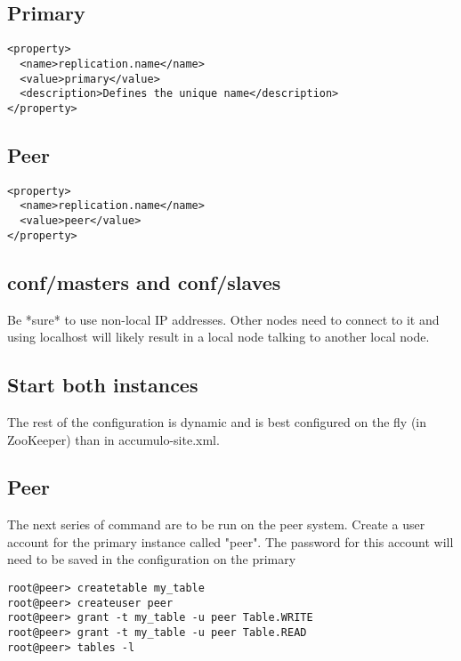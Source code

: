 \subsection{Primary}

\begingroup\fontsize{8pt}{8pt}\selectfont\begin{verbatim}
<property>
  <name>replication.name</name>
  <value>primary</value>
  <description>Defines the unique name</description>
</property>
\end{verbatim}\endgroup

\subsection{Peer}

\begingroup\fontsize{8pt}{8pt}\selectfont\begin{verbatim}
<property>
  <name>replication.name</name>
  <value>peer</value>
</property>
\end{verbatim}\endgroup

\subsection{conf/masters and conf/slaves}

Be *sure* to use non-local IP addresses. Other nodes need to connect to it and using localhost will likely result in
a local node talking to another local node.

\subsection{Start both instances}

The rest of the configuration is dynamic and is best configured on the fly (in ZooKeeper) than in accumulo-site.xml.

\subsection{Peer}

The next series of command are to be run on the peer system. Create a user account for the primary instance called
"peer". The password for this account will need to be saved in the configuration on the primary

\begingroup\fontsize{8pt}{8pt}\selectfont\begin{verbatim}
root@peer> createtable my_table
root@peer> createuser peer
root@peer> grant -t my_table -u peer Table.WRITE
root@peer> grant -t my_table -u peer Table.READ
root@peer> tables -l
\end{verbatim}\endgroup

